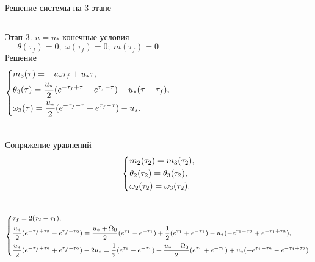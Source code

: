 \documentclass[10pt]{beamer}
\begin{document}
\begin{frame}{Решение системы на 3 этапе}
	\begin{columns}
		Этап 3. $u=u_*$ конечные условия
		\[
			\theta(\tau_f)=0;\ \omega(\tau_f)=0;\ m(\tau_f)=0
		\]
		Решение
		\begin{equation}\label{final3stage}
			\left\{ {\begin{aligned}
						 & m_3(\tau) = -u_*\tau_f+u_*\tau, \hfill                                                    \\
						 & \theta_3(\tau) = \frac{u_*}{2}(e^{-\tau_f+\tau}-e^{\tau_f-\tau})-u_*(\tau-\tau_f), \hfill \\
						 & \omega_3(\tau) = \frac{u_*}{2}(e^{-\tau_f+\tau}+e^{\tau_f-\tau})-u_*  . \hfill            \\
					\end{aligned}} \right.
		\end{equation}
	\end{columns}
\end{frame}

\begin{frame}{Сопряжение уравнений}
	\begin{equation}
		\left\{ {\begin{aligned}
					 & m_2(\tau_2) = m_3(\tau_2), \hfill            \\
					 & \theta_2(\tau_2) =  \theta_3(\tau_2), \hfill \\
					 & \omega_2(\tau_2) = \omega_3(\tau_2) . \hfill \\
				\end{aligned}} \right.
	\end{equation}
	\begin{columns}
		\column{1.2\textwidth}
		{\footnotesize
			\begin{equation}
				\footnotesize\left\{ {\begin{aligned}
							 & \tau_f=2(\tau_2-\tau_1), \hfill                                                                                                                                                                 \\
							 & \frac{u_*}{2}(e^{-\tau_f+\tau_2}-e^{\tau_f-\tau_2}) =\frac{u_*+\Omega_0}{2}(e^{\tau_1}-e^{-\tau_1})+\frac{1}{2}(e^{\tau_1}+e^{-\tau_1})-u_*(-e^{\tau_1-\tau_2}+e^{-\tau_1+\tau_2}), \hfill      \\
							 & \frac{u_*}{2}(e^{-\tau_f+\tau_2}+e^{\tau_f-\tau_2})-2u_*=\frac{1}{2}(e^{\tau_1}-e^{-\tau_1})+\frac{u_*+\Omega_0}{2}(e^{\tau_1}+e^{-\tau_1})+u_*(-e^{\tau_1-\tau_2}-e^{-\tau_1+\tau_2}) . \hfill \\
						\end{aligned}} \right.
			\end{equation}
		}
	\end{columns}
\end{frame}
\end{document}
